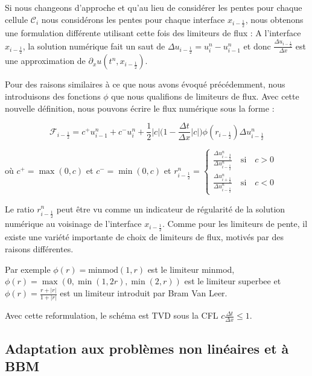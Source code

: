 Si nous changeons d'approche et qu'au lieu de considérer les pentes pour chaque cellule $\mathcal{C}_i$ nous considérons les pentes pour chaque 
interface $x_{i-\frac{1}{2}}$, nous obtenons une formulation différente utilisant cette fois des limiteurs de flux :
A l'interface $x_{i-\frac{1}{2}}$, la solution numérique fait un saut de $\Delta u_{i-\frac{1}{2}} = u_i^n - u_{i-1}^n$ et donc $\frac{\Delta u_{i-{\frac{1}{2}}}}{\Delta x}$ 
est une approximation de $\partial_xu(t^n,x_{i-\frac{1}{2}})$.

Pour des raisons similaires à ce que nous avons évoqué précédemment, nous introduisons des fonctions $\phi$ que nous qualifions de limiteurs de flux. 
Avec cette nouvelle définition, nous pouvons écrire le flux numérique sous la forme :

$$\mathcal{F}_{i-\frac{1}{2}} = c^+u_{i-1}^n + c^-u_i^n + \frac{1}{2}|c|\biggl( 1 - \frac{\Delta t}{\Delta x} |c| \biggr)\phi(r_{i-\frac{1}{2}})\Delta u_{i-\frac{1}{2}}^n$$

où $c^+ = \max(0,c)$ et $c^- = \min(0,c)$ et $r_{i-\frac{1}{2}}^n = 
\begin{cases}
    \frac{\Delta u_{i - \frac{3}{2}}^n}{\Delta u_{i - \frac{1}{2}}^n} \quad \text{si} \quad c>0 \\
    \frac{\Delta u_{i + \frac{1}{2}}^n}{\Delta u_{i - \frac{1}{2}}^n} \quad \text{si} \quad c<0
\end{cases} $

Le ratio $r_{i-\frac{1}{2}}^n$ peut être vu comme un indicateur de régularité de la solution numérique au voisinage de l'interface $x_{i - \frac{1}{2}}$.
Comme pour les limiteurs de pente, il existe une variété importante de choix de limiteurs de flux, motivés par des raisons différentes.

Par exemple $\phi(r) = \text{minmod}(1,r)$ est le limiteur minmod, $\phi(r) = \max(0,\min(1,2r),\min(2,r))$ est le limiteur superbee 
et $\phi(r) = \frac{r + |r|}{1 + |r|}$ est un limiteur introduit par Bram Van Leer.

Avec cette reformulation, le schéma est TVD sous la CFL $c\frac{\Delta t}{\Delta x} \leq 1$.

\subsection{Adaptation aux problèmes non linéaires et à BBM}

